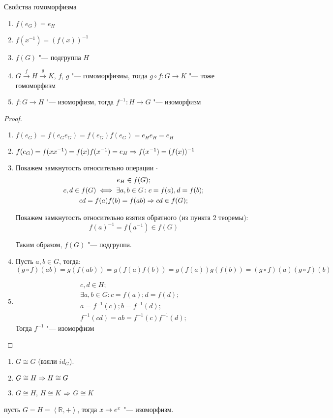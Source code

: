 \begin{theorem}{Свойства гомоморфизма}
	\begin{enumerate}
		\item $f(e_G) = e_H$
		\item $f(x^{-1}) = (f(x))^{-1}$
		\item $f(G)$ "--- подгруппа $H$
		\item $G \xrightarrow{f} H \xrightarrow{g} K$, $f$, $g$ "--- гомоморфизмы, тогда $g \circ f: G \to K$ "--- тоже гомоморфизм
		\item $f: G \to H$ "--- изоморфизм, тогда $f^{-1}: H \to G$ "--- изоморфизм
	\end{enumerate}
\end{theorem}
\begin{proof}
	\begin{enumerate}
		\item $f(e_G) = f(e_G e_G) = f(e_G)f(e_G) = e_H e_H = e_H$
		\item $f(e_G) = f(x x^{-1}) = f(x)f(x^{-1}) = e_H \Rightarrow f(x^{-1}) = (f(x))^{-1}$
		\item
		    Покажем замкнутость относительно операции $\cdot$
		    \begin{gather*}
			e_H \in f(G); \\
			c, d \in f(G) \iff \exists a, b \in G \colon c = f(a), d = f(b); \\
			cd = f(a)f(b) = f(ab) \Rightarrow cd \in f(G); \\
			\end{gather*}

			Покажем замкнутость относительно взятия обратного (из пункта 2 теоремы):
			\[f(a)^{-1} = f(a^{-1}) \in f(G)\]

			Таким образом, $f(G)$ "--- подгруппа.
		\item Пусть $a, b \in G$, тогда:
			\[(g \circ f)(ab) = g(f(ab)) = g(f(a)f(b)) = g(f(a))g(f(b)) = (g \circ f)(a)(g \circ f)(b)\]
		\item
			\begin{gather*}
			c, d \in H; \\
			\exists a, b \in G\colon c = f(a); d = f(d); \\
			a = f^{-1}(c); b = f^{-1}(d); \\
			f^{-1}(cd) = ab = f^{-1}(c)f^{-1}(d);
			\end{gather*}
			Тогда $f^{-1}$ "--- изоморфизм
	\end{enumerate}   
\end{proof}		

\begin{conseq}
    \begin{enumerate}
    \item  $G \cong G$ (взяли $id_G$).
    \item  $G \cong H \Rightarrow H \cong G$
    \item  $G \cong H$, $H \cong K$ $\Rightarrow$ $G \cong K$
    \end{enumerate}

\end{conseq}

\begin{exmp}
пусть $G=H=\left< \mathbb{R}, +\right>$, тогда $x \rightarrow e^x$ "--- изоморфизм.
\end{exmp}
